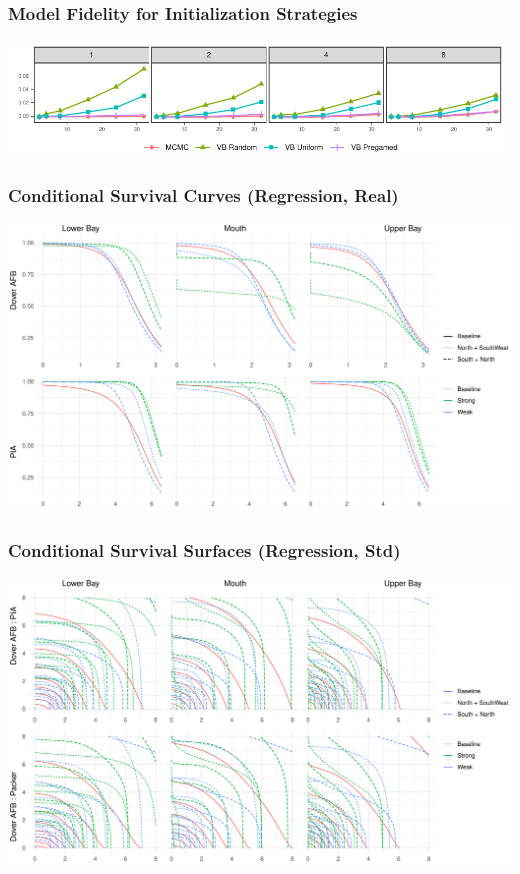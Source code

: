 \documentclass[aspectratio=169,10pt,notes]{beamer}
\newlength{\frametextheight}
\begin{document}
\begin{frame}
    \frametitle{Model Fidelity for Initialization Strategies}
    \begin{center}
    \includegraphics[width = 0.99\textwidth]{./ch3/plots/energy_score}
    \end{center}
\end{frame} %


\begin{frame}
    \frametitle{Conditional Survival Curves (Regression, Real)}
    \begin{center}
        \includegraphics[height=0.99\frametextheight]{./ch3/plots/condsurv_reg/condsurv_reg_1d_real}
    \end{center}
\end{frame}


\begin{frame}
    \frametitle{Conditional Survival Surfaces (Regression, Std)}
    \begin{center}
        \includegraphics[height=0.99\frametextheight]{./ch3/plots/condsurv_reg/condsurv_reg_2d_std}
    \end{center}
\end{frame}
\end{document}
